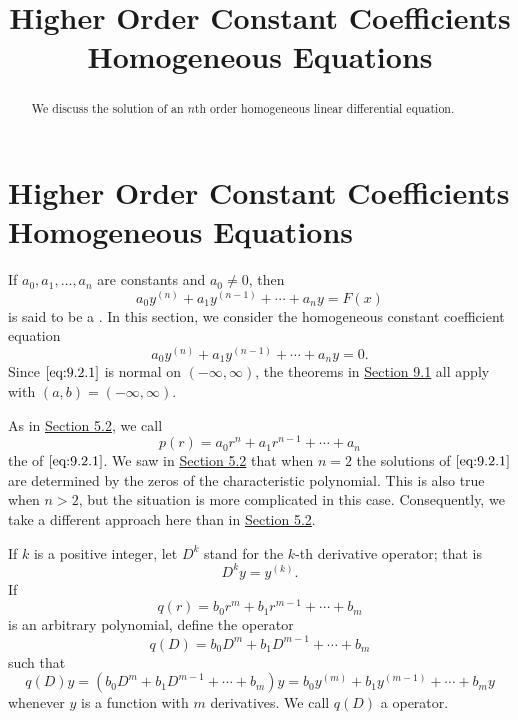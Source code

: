 \documentclass{ximera}
\title{Higher Order Constant Coefficients Homogeneous Equations}%
\begin{document}
\begin{abstract}
We discuss the solution of an $n$th order homogeneous linear differential equation.
\end{abstract}

\maketitle

\section*{Higher Order Constant Coefficients Homogeneous Equations}

If $a_0, a_1, \dots, a_n$ are constants and $a_0\neq 0$, then
$$
a_0y^{(n)}+a_1y^{(n-1)}+\cdots+a_ny=F(x)
$$
is said to be a .
In this section, we consider the homogeneous constant coefficient
equation
\begin{equation} \label{eq:9.2.1}
a_0y^{(n)}+a_1y^{(n-1)}+\cdots+a_ny=0.
\end{equation}
Since $\eqref{eq:9.2.1}$ is normal on $(-\infty,\infty)$, the theorems in
\href{https://ximera.osu.edu/ode/main/linearHigherOrder/linearHigherOrder}{Section 9.1} all apply with $(a,b)=(-\infty,\infty)$.

As in \href{https://ximera.osu.edu/ode/main/constantCoefficientHomogeneousEquations/constantCoefficientHomogeneousEquations}{Section 5.2}, we call
\begin{equation} \label{eq:9.2.2}
p(r)=a_0r^n+a_1r^{n-1}+\cdots+a_n
\end{equation}
the  of $\eqref{eq:9.2.1}$. We saw in
\href{https://xerxes.ximera.org/differentialequations/main/constantCoefficientHomogeneousEquations/constantCoefficientHomogeneousEquations}{Section 5.2} that when $n=2$ the solutions of $\eqref{eq:9.2.1}$ are
determined by the zeros of the characteristic polynomial. This is also
true when $n>2$, but the situation is more complicated in this case.
Consequently, we take a different approach here than in
\href{https://xerxes.ximera.org/differentialequations/main/constantCoefficientHomogeneousEquations/constantCoefficientHomogeneousEquations}{Section 5.2}.

If $k$ is a positive integer, let $D^k$ stand
for the $k$-th derivative operator;   that is
$$
D^ky=y^{(k)}.
$$
If
$$
q(r)=b_0r^m+b_1r^{m-1}+\cdots+b_m
$$
is an arbitrary polynomial,  define the operator
$$
q(D)=b_0D^m+b_1D^{m-1}+\cdots+b_m
$$
such that
$$
q(D)y=(b_0D^m+b_1D^{m-1}+\cdots+b_m)y=b_0y^{(m)}+b_1y^{(m-1)}+\cdots+
b_my
$$
whenever $y$ is a function with $m$ derivatives. We call $q(D)$
a   operator.
\end{document}
